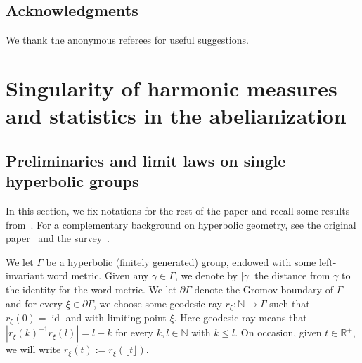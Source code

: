 \documentclass[AHL,Unicode,longabstracts,published]{cedram}
\DeclareMathOperator{\id}{id}
\newcommand{\N}{\mathbb{N}}
\newcommand{\R}{\mathbb{R}}
\renewcommand{\(}{\left(}
\renewcommand{\)}{\right)}
\begin{document}
\subsection*{Acknowledgments}
We thank the anonymous referees for useful suggestions.


\section{Singularity of harmonic measures and statistics in the abelianization}

\subsection{Preliminaries and limit laws on single hyperbolic groups}\label{Sec:limit_laws}

In this section, we fix notations for the rest of the paper and recall some results from~\cite{BenardWinding}. For a complementary background on hyperbolic geometry, see the original paper~\cite{GromovHyperbolic} and the survey~\cite{Calegari}.


We let $\Gamma$ be a hyperbolic (finitely generated) group, endowed with some left-invariant word metric. Given any $\gamma\in \Gamma$, we denote by $|\gamma|$ the distance from $\gamma$ to the identity for the word metric. We let $\partial \Gamma$ denote the Gromov boundary of $\Gamma$ and for every $\xi\in \partial \Gamma$, we choose some geodesic ray $r_{\xi}:\N\rightarrow \Gamma$ such that $r_{\xi}(0)=\id$ and with limiting point $\xi$. Here geodesic ray means that $|r_{\xi}(k)^{-1}r_{\xi}(l)|=l-k$ for every $k,l\in \N$ with $k\leq l$. On occasion, given $t\in \R^+$, we will write $r_{\xi}(t):=r_{\xi}(\lfloor t \rfloor)$.
\end{document}
